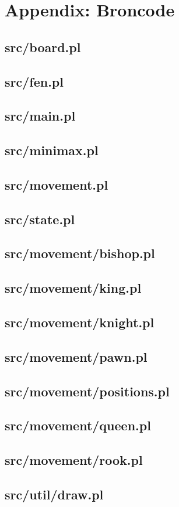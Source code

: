 \chapter*{Appendix: Broncode}

\section{src/board.pl}

\section{src/fen.pl}

\section{src/main.pl}

\section{src/minimax.pl}

\section{src/movement.pl}

\section{src/state.pl}

\newpage
\section{src/movement/bishop.pl}

\section{src/movement/king.pl}

\section{src/movement/knight.pl}

\section{src/movement/pawn.pl}

\section{src/movement/positions.pl}

\newpage
\section{src/movement/queen.pl}

\section{src/movement/rook.pl}

\newpage
\section{src/util/draw.pl}

